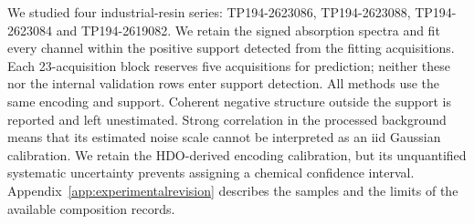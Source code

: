 We studied four industrial-resin series: TP194-2623086, TP194-2623088,
TP194-2623084 and TP194-2619082. We retain the signed absorption spectra and fit
every channel within the positive support detected from the fitting acquisitions.
Each 23-acquisition block reserves five acquisitions for prediction; neither
these nor the internal validation rows enter support detection. All methods use
the same encoding and support. Coherent negative structure outside the support is
reported and left unestimated. Strong correlation in the processed background
means that its estimated noise scale cannot be interpreted as an iid Gaussian
calibration. We retain the HDO-derived encoding calibration, but its unquantified
systematic uncertainty prevents assigning a chemical confidence interval.
Appendix~\ref{app:experimentalrevision} describes the samples and the limits of
the available composition records.